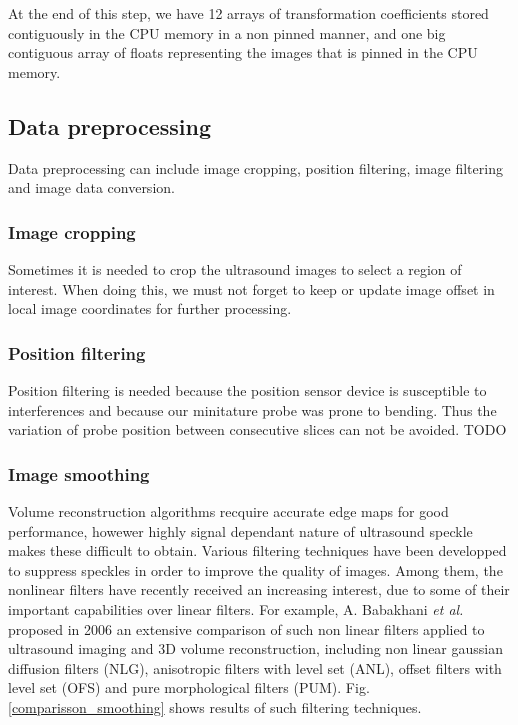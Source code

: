 \documentclass[12pt,journal,compsoc]{IEEEtran}
\begin{document}
At the end of this step, we have 12 arrays of transformation coefficients stored contiguously in the CPU memory in a non pinned manner, and one big contiguous array of floats representing the images that is pinned in the CPU memory. 

\subsection{Data preprocessing}

Data preprocessing can include image cropping, position filtering, image filtering and image data conversion.\par

\subsubsection{Image cropping}
Sometimes it is needed to crop the ultrasound images to select a region of interest. When doing this, we must not forget to keep or update image offset in local image coordinates for further processing. 

\subsubsection{Position filtering}
Position filtering is needed because the position sensor device is susceptible to interferences and because our minitature probe was prone to bending. Thus the variation of probe position between consecutive slices can not be avoided. TODO\par

\subsubsection{Image smoothing}
Volume reconstruction algorithms recquire accurate edge maps for good performance, howewer highly signal dependant nature of ultrasound speckle makes these difficult to obtain. Various filtering techniques have been developped to suppress speckles in order to improve the quality of images. 
Among them, the nonlinear filters have recently received an increasing interest, due to some of their important capabilities over linear filters. For example, A. Babakhani \textit{et al.}\cite{1} proposed in 2006 an extensive comparison of such non linear filters applied to ultrasound imaging and 3D volume reconstruction, including non linear gaussian diffusion filters (NLG), anisotropic filters with level set (ANL), offset filters with level set (OFS) and pure morphological filters (PUM). Fig.\ref{comparisson_smoothing} shows results of such filtering techniques.\par
\end{document}
